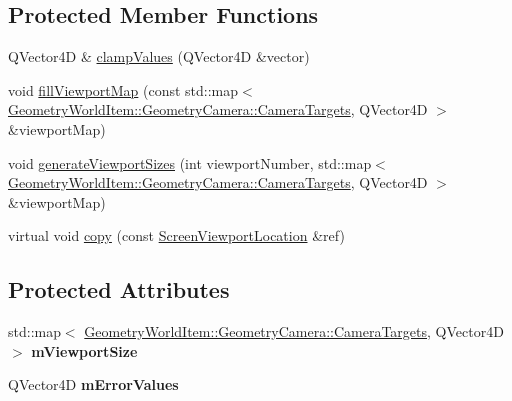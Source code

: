 \subsection*{Protected Member Functions}
\begin{DoxyCompactItemize}
\item 
Q\+Vector4D \& \mbox{\hyperlink{class_geometry_engine_1_1_geometry_render_step_1_1_screen_viewport_location_aca54be537a99da891061c74cb1573f07}{clamp\+Values}} (Q\+Vector4D \&vector)
\item 
void \mbox{\hyperlink{class_geometry_engine_1_1_geometry_render_step_1_1_screen_viewport_location_a84ffff22eb9d9ec9caf22682b05150f4}{fill\+Viewport\+Map}} (const std\+::map$<$ \mbox{\hyperlink{namespace_geometry_engine_1_1_geometry_world_item_1_1_geometry_camera_a3766848bae97ff8203fa26907ac359ef}{Geometry\+World\+Item\+::\+Geometry\+Camera\+::\+Camera\+Targets}}, Q\+Vector4D $>$ \&viewport\+Map)
\item 
void \mbox{\hyperlink{class_geometry_engine_1_1_geometry_render_step_1_1_screen_viewport_location_ae4caebeff48aecdbd559be7ae3a3799d}{generate\+Viewport\+Sizes}} (int viewport\+Number, std\+::map$<$ \mbox{\hyperlink{namespace_geometry_engine_1_1_geometry_world_item_1_1_geometry_camera_a3766848bae97ff8203fa26907ac359ef}{Geometry\+World\+Item\+::\+Geometry\+Camera\+::\+Camera\+Targets}}, Q\+Vector4D $>$ \&viewport\+Map)
\item 
virtual void \mbox{\hyperlink{class_geometry_engine_1_1_geometry_render_step_1_1_screen_viewport_location_ac84bf098c2402b2e920f7dcc798702dc}{copy}} (const \mbox{\hyperlink{class_geometry_engine_1_1_geometry_render_step_1_1_screen_viewport_location}{Screen\+Viewport\+Location}} \&ref)
\end{DoxyCompactItemize}
\subsection*{Protected Attributes}
\begin{DoxyCompactItemize}
\item 
\mbox{\label{class_geometry_engine_1_1_geometry_render_step_1_1_screen_viewport_location_a6d22feae7a79e194c6babc43945c79a2}} 
std\+::map$<$ \mbox{\hyperlink{namespace_geometry_engine_1_1_geometry_world_item_1_1_geometry_camera_a3766848bae97ff8203fa26907ac359ef}{Geometry\+World\+Item\+::\+Geometry\+Camera\+::\+Camera\+Targets}}, Q\+Vector4D $>$ {\bfseries m\+Viewport\+Size}
\item 
\mbox{\label{class_geometry_engine_1_1_geometry_render_step_1_1_screen_viewport_location_a2b84bf0360360b97ec485525631a939c}} 
Q\+Vector4D {\bfseries m\+Error\+Values}
\end{DoxyCompactItemize}


